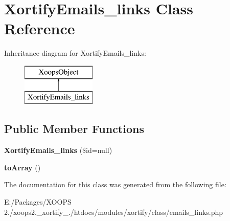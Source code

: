 \hypertarget{class_xortify_emails__links}{\section{Xortify\-Emails\-\_\-links Class Reference}
\label{class_xortify_emails__links}
}
Inheritance diagram for Xortify\-Emails\-\_\-links\-:\begin{figure}[H]
\begin{center}
\leavevmode
\includegraphics[height=2.000000cm]{class_xortify_emails__links}
\end{center}
\end{figure}
\subsection*{Public Member Functions}
\begin{DoxyCompactItemize}
\item 
\hypertarget{class_xortify_emails__links_af461a7ab5e840521f904fd3c091e41f9}{{\bfseries Xortify\-Emails\-\_\-links} (\$id=null)}\label{class_xortify_emails__links_af461a7ab5e840521f904fd3c091e41f9}

\item 
\hypertarget{class_xortify_emails__links_a6dfbb491fe72d4ed306c80ed56ac4c7c}{{\bfseries to\-Array} ()}\label{class_xortify_emails__links_a6dfbb491fe72d4ed306c80ed56ac4c7c}

\end{DoxyCompactItemize}


The documentation for this class was generated from the following file\-:\begin{DoxyCompactItemize}
\item 
E\-:/\-Packages/\-X\-O\-O\-P\-S 2./xoops2.\-\_\-xortify\-\_./htdocs/modules/xortify/class/emails\-\_\-links.\-php\end{DoxyCompactItemize}

